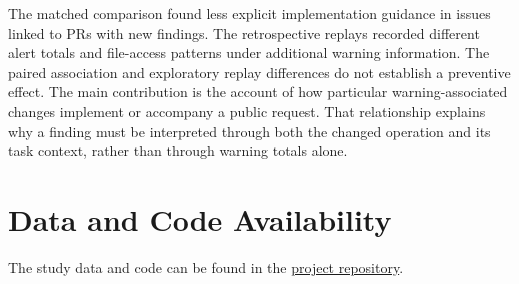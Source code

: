 \documentclass[acmsmall,screen,nonacm]{acmart}
\begin{document}
The matched comparison found less explicit implementation guidance in issues linked to PRs with new findings. The retrospective replays recorded different alert totals and file-access patterns under additional warning information. The paired association and exploratory replay differences do not establish a preventive effect. The main contribution is the account of how particular warning-associated changes implement or accompany a public request. That relationship explains why a finding must be interpreted through both the changed operation and its task context, rather than through warning totals alone.

\section*{Data and Code Availability}

The study data and code can be found in the \href{https://github.com/Stralb/adversarial-swe-agents}{project repository}.
\end{document}
